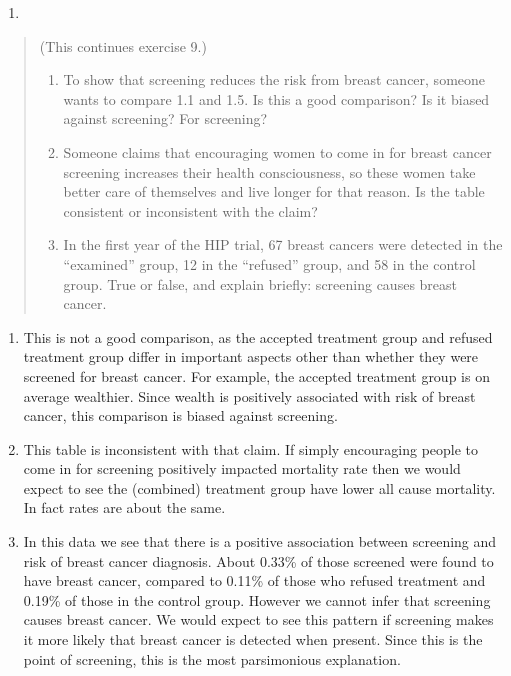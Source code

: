 \documentclass[
]{book}
\providecommand{\tightlist}{%
  \setlength{\itemsep}{0pt}\setlength{\parskip}{0pt}}
\begin{document}
\begin{enumerate}
\def\labelenumi{\arabic{enumi}.}
\setcounter{enumi}{9}
\tightlist
\item
\end{enumerate}

\begin{quote}
(This continues exercise 9.)

\begin{enumerate}
\def\labelenumi{\alph{enumi}.}
\item
  To show that screening reduces the risk from breast cancer, someone wants to compare 1.1 and 1.5. Is this a good comparison? Is it biased against screening? For screening?
\item
  Someone claims that encouraging women to come in for breast cancer screening increases their health consciousness, so these women take better care of themselves and live longer for that reason. Is the table consistent or inconsistent with the claim?
\item
  In the first year of the HIP trial, 67 breast cancers were detected in the ``examined'' group, 12 in the ``refused'' group, and 58 in the control group. True or false, and explain briefly: screening causes breast cancer.
\end{enumerate}
\end{quote}

\begin{enumerate}
\def\labelenumi{\alph{enumi}.}
\item
  This is not a good comparison, as the accepted treatment group and refused treatment group differ in important aspects other than whether they were screened for breast cancer. For example, the accepted treatment group is on average wealthier. Since wealth is positively associated with risk of breast cancer, this comparison is biased against screening.
\item
  This table is inconsistent with that claim. If simply encouraging people to come in for screening positively impacted mortality rate then we would expect to see the (combined) treatment group have lower all cause mortality. In fact rates are about the same.
\item
  In this data we see that there is a positive association between screening and risk of breast cancer diagnosis. About 0.33\% of those screened were found to have breast cancer, compared to 0.11\% of those who refused treatment and 0.19\% of those in the control group. However we cannot infer that screening causes breast cancer. We would expect to see this pattern if screening makes it more likely that breast cancer is detected when present. Since this is the point of screening, this is the most parsimonious explanation.
\end{enumerate}
\end{document}
